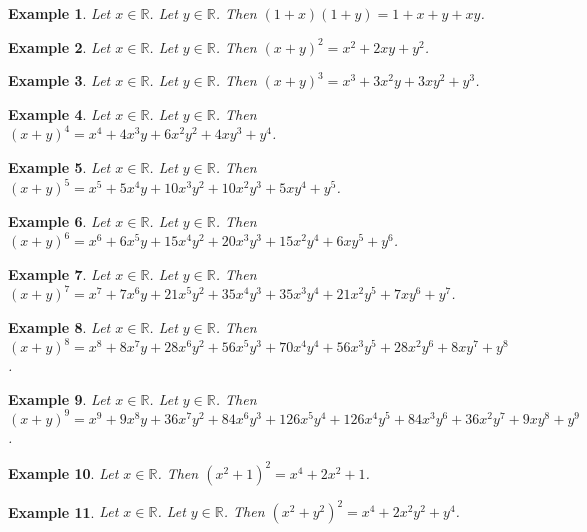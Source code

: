 \documentclass{article}
\newtheorem{example}{Example}
\begin{document}
\begin{example}
Let $x\in\mathbb{R}$. Let $y\in\mathbb{R}$. Then $(1+x)(1+y)=1+x+y+xy$.
\end{example}

\begin{example}
Let $x\in\mathbb{R}$. Let $y\in\mathbb{R}$. Then ${(x+y)}^2=x^2+2xy+y^2$.
\end{example}

\begin{example}
Let $x\in\mathbb{R}$. Let $y\in\mathbb{R}$. Then ${(x+y)}^3=x^3+3x^2y+3xy^2+y^3$.
\end{example}

\begin{example}
Let $x\in\mathbb{R}$. Let $y\in\mathbb{R}$. Then ${(x+y)}^4=x^4+4x^3y+6x^2y^2+4xy^3+y^4$.
\end{example}

\begin{example}
Let $x\in\mathbb{R}$. Let $y\in\mathbb{R}$. Then ${(x+y)}^5=x^5+5x^4y+10x^3y^2+10x^2y^3+5xy^4+y^5$.
\end{example}

\begin{example}
Let $x\in\mathbb{R}$. Let $y\in\mathbb{R}$. Then ${(x+y)}^6=x^6+6x^5y+15x^4y^2+20x^3y^3+15x^2y^4+6xy^5+y^6$.
\end{example}

\begin{example}
Let $x\in\mathbb{R}$. Let $y\in\mathbb{R}$. Then ${(x+y)}^7=x^7+7x^6y+21x^5y^2+35x^4y^3+35x^3y^4+21x^2y^5+7xy^6+y^7$.
\end{example}

\begin{example}
Let $x\in\mathbb{R}$. Let $y\in\mathbb{R}$. Then ${(x+y)}^8=x^8+8x^7y+28x^6y^2+56x^5y^3+70x^4y^4+56x^3y^5+28x^2y^6+8xy^7+y^8$.
\end{example}

\begin{example}
Let $x\in\mathbb{R}$. Let $y\in\mathbb{R}$. Then ${(x+y)}^9=x^9+9x^8y+36x^7y^2+84x^6y^3+126x^5y^4+126x^4y^5+84x^3y^6+36x^2y^7+9xy^8+y^9$.
\end{example}

\begin{example}
Let $x\in\mathbb{R}$. Then ${(x^2+1)}^2=x^4+2x^2+1$.
\end{example}

\begin{example}
Let $x\in\mathbb{R}$. Let $y\in\mathbb{R}$. Then ${(x^2+y^2)}^2=x^4+2x^2y^2+y^4$.
\end{example}
\end{document}
